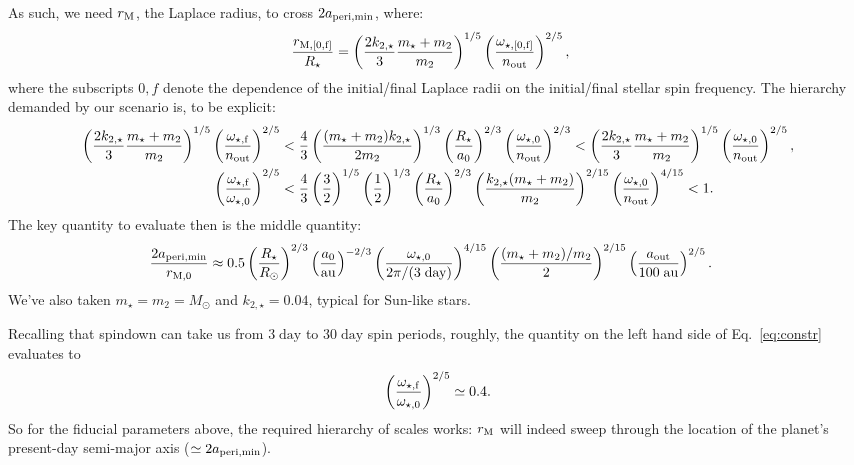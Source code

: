 \documentclass[11pt,
        usenames, %
        dvipsnames %
    ]{article}
\newcommand*{\p}[1]{\left(#1\right)}
\begin{document}
As such, we need $r_{\rm M}$, the Laplace radius, to cross $2a_{\rm peri, \min}$,
where:
\begin{align}
    \frac{r_{\rm M, [0, f]}}{R_\star}
        &=
            \p{\frac{2k_{2,\star}}{3}
                \frac{m_\star + m_2}{m_2}}^{1/5}
                \p{\frac{\omega_{\rm \star,[0, f]}}{n_{\rm out}}}^{2/5}
                ,
\end{align}
where the subscripts $0, f$ denote the dependence of the initial/final
Laplace radii on the initial/final stellar spin frequency.
The hierarchy demanded by our scenario is, to be explicit:
{\small
\begin{align}
    \p{\frac{2k_{2,\star}}{3}
        \frac{m_\star + m_2}{m_2}}^{1/5}
        \p{\frac{\omega_{\rm \star,f}}{n_{\rm out}}}^{2/5}
        &<
            \frac{4}{3}
            \p{\frac{(m_\star + m_2)k_{2,\star}}{2m_2}}^{1/3}
            \p{\frac{R_\star}{a_0}}^{2/3}
            \p{\frac{\omega_{\rm \star, 0}}{n_{\rm out}}}^{2/3}
        <
    \p{\frac{2k_{2,\star}}{3}
        \frac{m_\star + m_2}{m_2}}^{1/5}
        \p{\frac{\omega_{\rm \star,0}}{n_{\rm out}}}^{2/5},\\
    \p{\frac{\omega_{\rm \star,f}}{\omega_{\rm \star,0}}}^{2/5}
        &<
            \frac{4}{3}
            \p{\frac{3}{2}}^{1/5}
            \p{\frac{1}{2}}^{1/3}
            \p{\frac{R_\star}{a_0}}^{2/3}
            \p{\frac{k_{2,\star}(m_\star + m_2)}{m_2}}^{2/15}
            \p{\frac{\omega_{\rm \star, 0}}{n_{\rm out}}}^{4/15}
        <
    1.\label{eq:constr}
\end{align}}
The key quantity to evaluate then is the middle quantity:
\begin{align}
    \frac{2a_{\rm peri, \min}}{r_{\rm M, 0}}
        &\approx
        0.5
            \p{\frac{R_\star}{R_{\odot}}}^{2/3}
            \p{\frac{a_0}{\mathrm{au}}}^{-2/3}
            \p{\frac{\omega_{\star, 0}}{2\pi / (3\;\mathrm{day})}}^{4/15}
            \p{\frac{(m_\star + m_2) / m_2}{2}}^{2/15}
            \p{\frac{a_{\rm out}}{100\;\mathrm{au}}}^{2/5}.
\end{align}
We've also taken $m_{\star} = m_2 = M_{\odot}$ and $k_{2,\star} = 0.04$, typical
for Sun-like stars.

Recalling that spindown can take us from $3\;\mathrm{day}$ to $30\;\mathrm{day}$
spin periods, roughly, the quantity on the left hand side of
Eq.~\eqref{eq:constr} evaluates to
\begin{equation}
    \p{\frac{\omega_{\rm \star,f}}{\omega_{\rm \star,0}}}^{2/5}
        \simeq 0.4.
\end{equation}
So for the fiducial parameters above, the required hierarchy of scales works:
$r_{\rm M}$ will indeed sweep through the location of the planet's present-day
semi-major axis ($\simeq 2a_{\rm peri, \min}$).
\end{document}
